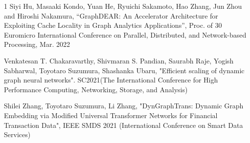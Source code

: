 \begin{査読付}{1}
Siyi Hu, Masaaki Kondo, Yuan He, Ryuichi Sakamoto, Hao Zhang, Jun Zhou
and Hiroshi Nakamura, ``GraphDEAR: An Accelerator Architecture for
Exploiting Cache Locality in Graph Analytics Applications'', Proc. of 30
Euromicro International Conference on Parallel, Distributed, and
Network-based Processing, Mar. 2022


Venkatesan T. Chakaravarthy, Shivmaran S. Pandian, Saurabh Raje, Yogish Sabharwal, Toyotaro Suzumura, Shashanka Ubaru, 
"Efficient scaling of dynamic graph neural networks". SC2021(The International Conference for High Performance Computing, Networking, Storage, and Analysis)

Shilei Zhang, Toyotaro Suzumura, Li Zhang, "DynGraphTrans: Dynamic Graph Embedding via Modified Universal Transformer Networks for Financial Transaction Data", IEEE SMDS 2021 (International Conference on Smart Data Services) 
\end{査読付}

%
%
%
%
%


